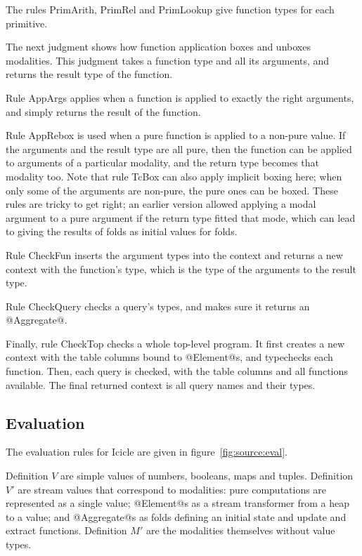 The rules PrimArith, PrimRel and PrimLookup give function types for each primitive.

The next judgment shows how function application boxes and unboxes modalities.
This judgment takes a function type and all its arguments, and returns the result type of the function.

Rule AppArgs applies when a function is applied to exactly the right arguments, and simply returns the result of the function.

Rule AppRebox is used when a pure function is applied to a non-pure value.
If the arguments and the result type are all pure, then the function can be applied to arguments of a particular modality, and the return type becomes that modality too.
Note that rule TcBox can also apply implicit boxing here; when only some of the arguments are non-pure, the pure ones can be boxed.
These rules are tricky to get right; an earlier version allowed applying a modal argument to a pure argument if the return type fitted that mode, which can lead to giving the results of folds as initial values for folds.



Rule CheckFun inserts the argument types into the context and returns a new context with the function's type, which is the type of the arguments to the result type.

Rule CheckQuery checks a query's types, and makes sure it returns an @Aggregate@.

Finally, rule CheckTop checks a whole top-level program.
It first creates a new context with the table columns bound to @Element@s, and typechecks each function.
Then, each query is checked, with the table columns and all functions available.
The final returned context is all query names and their types.


\subsection{Evaluation}

The evaluation rules for Icicle are given in figure~\ref{fig:source:eval}.

Definition $V$ are simple values of numbers, booleans, maps and tuples.
Definition $V'$ are stream values that correspond to modalities: pure computations are represented as a single value;
@Element@s as a stream transformer from a heap to a value;
and @Aggregate@s as folds defining an initial state and update and extract functions.
Definition $M'$ are the modalities themselves without value types.


